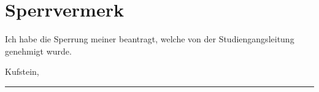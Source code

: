 \chapter*{Sperrvermerk}
\thispagestyle{empty}

Ich habe die Sperrung meiner \worktype beantragt, welche von der Studiengangsleitung genehmigt wurde.

\vspace{2cm}
Kufstein, \mydate

\vspace{2cm}
\rule{10cm}{1pt}\\
\myname{}
